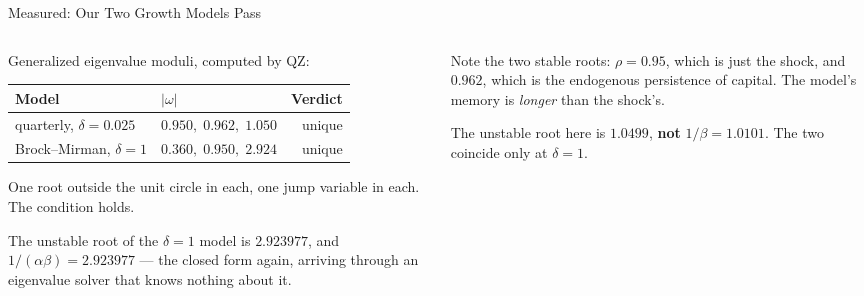 \begin{frame}{Measured: Our Two Growth Models Pass}
\begin{columns}[T]
\begin{column}{0.53\textwidth}
\small
Generalized eigenvalue moduli, computed by QZ:
\medskip
\begin{center}\footnotesize
\begin{tabularx}{\linewidth}{@{}>{\raggedright\arraybackslash}p{2.0cm} >{\raggedright\arraybackslash}X r@{}}
\toprule
\textbf{Model} & \textbf{$|\omega|$} & \textbf{Verdict} \\
\midrule
quarterly, $\delta=0.025$ & $0.950,\;0.962,\;\mathbf{1.050}$ & unique \\
Brock--Mirman, $\delta=1$ & $0.360,\;0.950,\;\mathbf{2.924}$ & unique \\
\bottomrule
\end{tabularx}
\end{center}
\medskip
One root outside the unit circle in each, one jump variable in each. The condition holds.
\medskip

The unstable root of the $\delta=1$ model is $2.923977$, and $1/(\alpha\beta)=2.923977$ --- the closed form again, arriving through an eigenvalue solver that knows nothing about it.
\end{column}
\begin{column}{0.44\textwidth}
\begin{takeawaybox}\footnotesize
Note the two stable roots: $\rho=0.95$, which is just the shock, and $0.962$, which is the endogenous persistence of capital. The model's memory is \emph{longer} than the shock's.
\end{takeawaybox}
\medskip
\begin{examplebox}\footnotesize
The unstable root here is $1.0499$, \textbf{not} $1/\beta=1.0101$. The two coincide only at $\delta=1$.
\end{examplebox}
\end{column}
\end{columns}
\vspace{1mm}
\end{frame}

